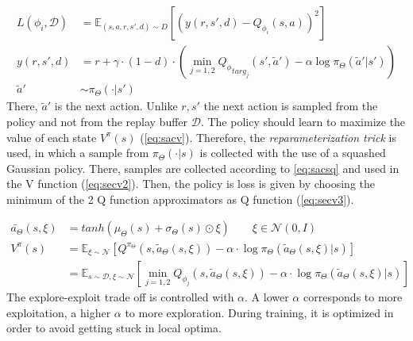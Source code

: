 \begin{align}
	L(\phi_i, \mathcal{D}) &= \mathbb{E}_{(s, a, r, s',d) \sim D} [(y(r,s',d) - Q_{\phi_i}(s,a))^2] \label{eq:sacloss}\\
	y(r,s',d) &= r + \gamma \cdot (1-d) \cdot
	(
	\min_{j=1,2} 
	{{}Q_\phi}_{targ_j}
	(s', \tilde{a}') - \alpha \log 
	\pi_{\Theta} (\tilde{a}'|s') )\label{eq:sactarget}\\
	\tilde{a}' &\sim \pi_{\Theta}(\cdot | s') \nonumber
 \end{align}
 There, $\tilde{a}'$ is the next action. Unlike $r,s'$ the next action is sampled from the policy and not from the replay buffer $\mathcal{D}$.
 \newpage
 The policy should learn to maximize the value of each state $V^{\pi} (s)$ (\cref{eq:sacv}). 
 Therefore, the \emph{reparameterization trick} is used, in which a sample from $\pi_{\Theta}(\cdot | s)$ 
 is collected with the use of a squashed Gaussian policy. 
 There, samples are collected according to \cref{eq:sacsq} and used in the V function (\cref{eq:secv2}). 
 Then, the policy is loss is given by choosing the minimum of the 2 Q function approximators as Q function (\cref{eq:secv3}).
 
 \begin{align}
 	\tilde{a_\Theta} (s, \xi) &= tanh(\mu_{\Theta}(s) + \sigma_{\Theta}(s) \odot \xi) \qquad \xi \in \mathcal{N}(0,I) \label{eq:sacsq}\\
 	V^{\pi} (s) &= \mathbb{E}_{\xi \sim \mathcal{N}} [Q^{\pi_\Theta} (s, \tilde{a}_\Theta(s, \xi)) - \alpha \cdot 
 	\log \pi_\Theta (\tilde{a}_\Theta(s, \xi)| s)
 	] \label{eq:secv2}\\
 	&= \mathbb{E}_{s \sim \mathcal{D}, \xi \sim \mathcal{N}} [\min_{j=1,2}
 	 Q_{\phi_j} (s, \tilde{a}_\Theta(s, \xi)) - \alpha \cdot 
 	\log \pi_\Theta (\tilde{a}_\Theta(s, \xi)| s)
 	] \label{eq:secv3}
 \end{align}
  The explore-exploit trade off is controlled with $\alpha$. 
  A lower $\alpha$ corresponds to more exploitation, a higher $\alpha$ to more exploration. 
  During training, it is optimized in order to avoid getting stuck in local optima.

